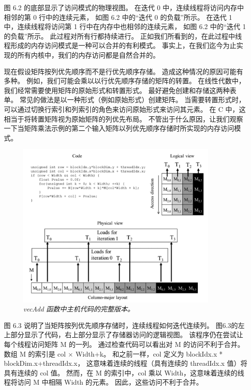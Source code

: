 图 6.2 的底部显示了访问模式的物理视图。 在迭代 0 中，连续线程将访问内存中相邻的第 0 行中的连续元素，
如图 6.2 中的“迭代 0 的负载”所示。 在迭代 1 中，连续线程将访问第 1 行中在内存中也相邻的连续元素，
如图 6.2 中的“迭代 1 的负载”所示。 此过程对所有行都持续进行。 
正如我们所看到的，在此过程中线程形成的内存访问模式是一种可以合并的有利模式。 
事实上，在我们迄今为止实现的所有内核中，我们的内存访问都是自然合并的。

现在假设矩阵按列优先顺序而不是行优先顺序存储。 造成这种情况的原因可能有多种。 
例如，我们可能会乘以以行优先顺序存储的矩阵的转置。 在线性代数中，我们经常需要使用矩阵的原始形式和转置形式。 
最好避免创建和存储这两种表单。 常见的做法是以一种形式（例如原始形式）创建矩阵。 
当需要转置形式时，可以通过切换行索引和列索引的角色来访问原始形式来访问其元素。 
在 C 中，这相当于将转置矩阵视为原始矩阵的列优先布局。 
不管出于什么原因，让我们观察一下当矩阵乘法示例的第二个输入矩阵以列优先顺序存储时所实现的内存访问模式。

\begin{figure}[H]
	\centering
	\includegraphics[width=0.9\textwidth]{figs/F6.3.png}
	\caption{\textit{\color{red} vecAdd 函数中主机代码的完整版本。}}
\end{figure}

图 6.3 说明了当矩阵按列优先顺序存储时，连续线程如何迭代连续列。 
图6.3的左上部分显示了代码，右上部分显示了存储器访问的逻辑视图。 该程序仍在尝试让每个线程访问矩阵 M 的一列。
通过检查代码可以看出对 M 的访问不利于合并。 数组 M 的索引是 col × Width+k。 
和之前一样，col 定义为 blockIdx.x * blockDim.x+threadIdx.x，
这意味着连续的线程（具有连续的 threadIdx.x 值）将具有连续的 col 值。 
然而，在 M 的索引中，col 乘以 Width，这意味着连续的线程将访问 M 中相隔 Width 的元素。 因此，这些访问不利于合并。

